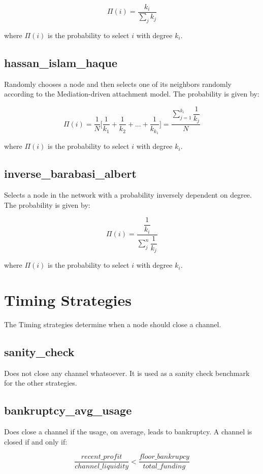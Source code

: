 \[ \Pi(i) = \dfrac{k_i}{\sum_{j}^{}k_j}  \]

where $\Pi(i)$ is the probability to select $i$ with degree $k_i$.

\subsection*{hassan\_islam\_haque}

Randomly chooses a node and then selects one of its neighbors randomly according to the Mediation-driven attachment model. The probability is given by:

\[ \Pi(i) = \dfrac{1}{N} \bigg\lbrack \dfrac{1}{k_1} + \dfrac{1}{k_2} + ... + \dfrac{1}{k_{k_1}} \bigg\rbrack = \dfrac{\sum_{j=1}^{k_i}\dfrac{1}{k_j}}{N} \]

where $\Pi(i)$ is the probability to select $i$ with degree $k_i$.

\subsection*{inverse\_barabasi\_albert}

Selects a node in the network with a probability inversely dependent on degree. The probability is given by:

\[ \Pi(i) =  \dfrac{\dfrac{1}{k_i}}{\sum_{j}^{n} \dfrac{1}{k_j}} \]
 
where $\Pi(i)$ is the probability to select $i$ with degree $k_i$.

\section*{Timing Strategies}
The Timing strategies determine when a node should close a channel.

\subsection*{sanity\_check}

Does not close any channel whatsoever. It is used as a sanity check benchmark for the other strategies.

\subsection*{bankruptcy\_avg\_usage}

Does close a channel if the usage, on average, leads to bankruptcy. A channel is closed if and only if:

\[ \frac{recent\_profit}{channel\_liquidity} < \frac{floor\_bankrupcy}{total\_funding} \]
 
